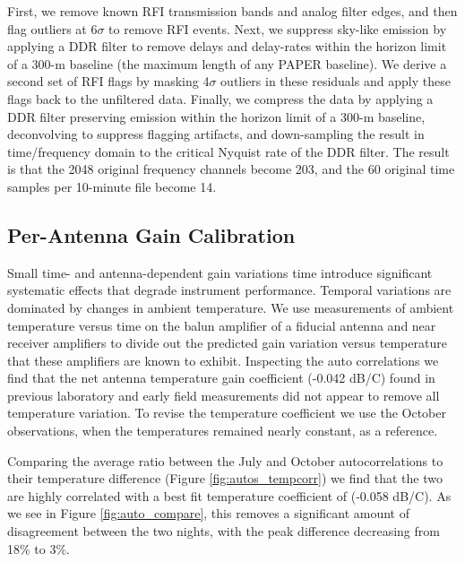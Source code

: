 \documentclass[preprint]{aastex}
\begin{document}
First, we remove known RFI transmission bands and analog filter edges, and then
flag outliers at 6$\sigma$ to remove RFI events.  Next, we suppress sky-like
emission by applying a DDR filter to remove delays and delay-rates within the
horizon limit of a 300-m baseline (the maximum length of any PAPER baseline).
We derive a second set of RFI flags by masking 4$\sigma$ outliers in these
residuals and apply these flags back to the unfiltered data.  Finally, we
compress the data by applying a DDR filter preserving emission within the
horizon limit of a 300-m baseline, deconvolving to suppress flagging artifacts,
and down-sampling the result in time/frequency domain to the critical Nyquist
rate of the DDR filter.  The result is that the 2048 original frequency
channels become 203, and the 60 original time samples per 10-minute file become
14. 


\subsection{Per-Antenna Gain Calibration}


Small time- and antenna-dependent gain variations time introduce significant systematic effects that degrade 
instrument performance. Temporal variations are dominated by changes in ambient temperature. 
We use measurements of ambient temperature versus time on the balun amplifier of a fiducial antenna and near
receiver amplifiers to divide out the predicted gain variation versus temperature that these amplifiers
are known to exhibit.  Inspecting the auto correlations we find that the net antenna temperature gain coefficient (-0.042 dB/C) found in previous laboratory \citep{Parashare:2011p9872} and early field 
measurements  \citep{Pober:2012p8800} did not appear to remove all temperature variation.  To
revise the temperature coefficient we use the October observations, when the temperatures remained nearly constant, as a reference.


Comparing the average ratio between the July and October autocorrelations to their temperature difference (Figure \ref{fig:autos_tempcorr}) we find that the two are highly correlated  with 
a best fit temperature coefficient of (-0.058 dB/C). As we see in Figure \ref{fig:auto_compare}, this removes a significant amount of disagreement between the two nights, 
with the peak difference decreasing from 18\% to 3\%.
\end{document}
